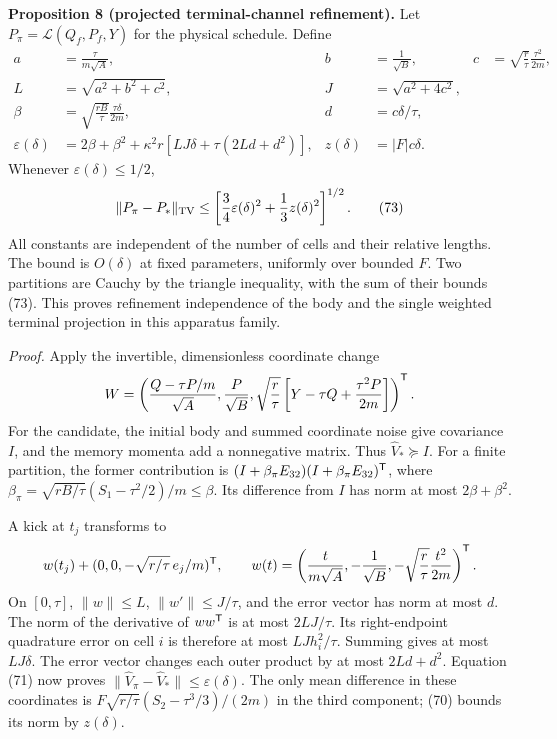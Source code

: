\documentclass[11pt,a4paper]{article}
\begin{document}
\textbf{Proposition 8 (projected terminal-channel refinement).} Let
\(P_\pi=\mathcal L(Q_f,P_f,Y)\) for the physical schedule. Define
\[\begin{aligned}
a&=\frac{\tau}{m\sqrt A},&b&=\frac1{\sqrt B},&
c&=\sqrt{\frac r\tau}\frac{\tau^2}{2m},\\
L&=\sqrt{a^2+b^2+c^2},&J&=\sqrt{a^2+4c^2},\\
\beta&=\sqrt{\frac{rB}\tau}\frac{\tau\delta}{2m},&
d&=c\delta/\tau,\\
\varepsilon(\delta)
 &=2\beta+\beta^2+
    \kappa^2r\left[LJ\delta+\tau(2Ld+d^2)\right],&
z(\delta)&=|F|c\delta.
\end{aligned}\] Whenever \(\varepsilon(\delta)\le1/2\),
\[\|P_\pi-P_*\|_{\rm TV}
\le\left[\frac34\varepsilon(\delta)^2+
                       \frac13z(\delta)^2\right]^{1/2}.
\tag{73}\] All constants are independent of the number of cells and
their relative lengths. The bound is \(O(\delta)\) at fixed parameters,
uniformly over bounded \(F\). Two partitions are Cauchy by the triangle
inequality, with the sum of their bounds (73). This proves refinement
independence of the body and the single weighted terminal projection in
this apparatus family.

\emph{Proof.} Apply the invertible, dimensionless coordinate change
\[W=\left(\frac{Q-\tau P/m}{\sqrt A},\frac P{\sqrt B},
 \sqrt{\frac r\tau}\left[Y-\tau Q+\frac{\tau^2P}{2m}\right]
 \right)^{\sf T}.\] For the candidate, the initial body and summed
coordinate noise give covariance \(I\), and the memory momenta add a
nonnegative matrix. Thus \(\widehat V_*\succeq I\). For a finite
partition, the former contribution is
\((I+\beta_\pi E_{32})(I+\beta_\pi E_{32})^{\sf T}\), where
\(\beta_\pi=\sqrt{rB/\tau}(S_1-\tau^2/2)/m\le\beta\). Its difference
from \(I\) has norm at most \(2\beta+\beta^2\).

A kick at \(t_j\) transforms to
\[w(t_j)+(0,0,-\sqrt{r/\tau}\,e_j/m)^{\sf T},\qquad
w(t)=\left(\frac t{m\sqrt A},-\frac1{\sqrt B},
                 -\sqrt{\frac r\tau}\frac{t^2}{2m}\right)^{\sf T}.\] On
\([0,\tau]\), \(\|w\|\le L\), \(\|w'\|\le J/\tau\), and the error vector
has norm at most \(d\). The norm of the derivative of \(ww^{\sf T}\) is
at most \(2LJ/\tau\). Its right-endpoint quadrature error on cell \(i\)
is therefore at most \(LJh_i^2/\tau\). Summing gives at most
\(LJ\delta\). The error vector changes each outer product by at most
\(2Ld+d^2\). Equation (71) now proves
\(\|\widehat V_\pi-\widehat V_*\|\le\varepsilon(\delta)\). The only mean
difference in these coordinates is \(F\sqrt{r/\tau}(S_2-\tau^3/3)/(2m)\)
in the third component; (70) bounds its norm by \(z(\delta)\).
\end{document}
